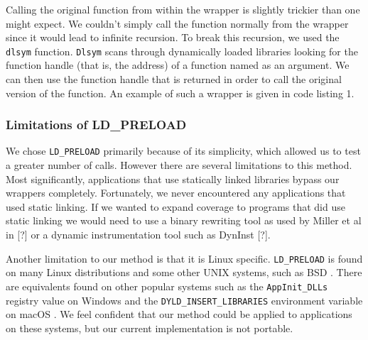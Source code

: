 Calling the original function from within the wrapper is slightly trickier than one might expect. We couldn't simply call the function normally from the wrapper since it would lead to infinite recursion. To break this recursion, we used the \texttt{dlsym} function. \texttt{Dlsym} scans through dynamically loaded libraries looking for the function handle (that is, the address) of a function named as an argument. We can then use the function handle that is returned in order to call the original version of the function. An example of such a wrapper is given in code listing 1.

\begin{minipage}{\linewidth} %
	
\end{minipage}

\subsubsection{Limitations of LD\_PRELOAD}
We chose \texttt{LD\_PRELOAD} primarily because of its simplicity, which allowed us to test a greater number of calls. However there are several limitations to this method. Most significantly, applications that use statically linked libraries bypass our wrappers completely. Fortunately, we never encountered any applications that used static linking. If we wanted to expand coverage to programs that did use static linking we would need to use a binary rewriting tool as used by Miller et al in [?] or a dynamic instrumentation tool such as DynInst [?].

Another limitation to our method is that it is Linux specific. \texttt{LD\_PRELOAD} is found on many Linux distributions and some other UNIX systems, such as BSD \cite{bsd}. There are equivalents found on other popular systems such as the \texttt{AppInit\_DLLs} registry value on Windows \cite{dll} and the \texttt{DYLD\_INSERT\_LIBRARIES} environment variable on macOS \cite{macos}. We feel confident that our method could be applied to applications on these systems, but our current implementation is not portable.